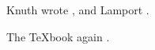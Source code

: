 \documentclass{article}
\begin{document}
Knuth wrote \cite{knuth1984texbook}, and Lamport \cite{lamport1994latex}.

\newpage
The \TeX book again \cite{knuth1984texbook}.
\printbibliography
\end{document}
